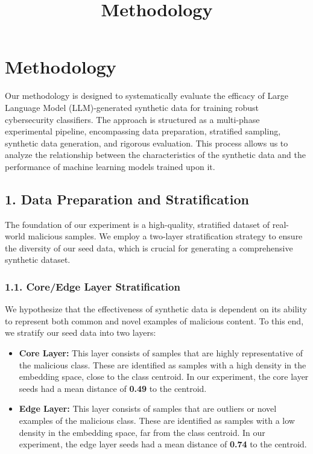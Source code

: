 \documentclass{article}
\title{Methodology}
\author{}
\date{}
\begin{document}
\maketitle

\section*{Methodology}

Our methodology is designed to systematically evaluate the efficacy of Large Language Model (LLM)-generated synthetic data for training robust cybersecurity classifiers. The approach is structured as a multi-phase experimental pipeline, encompassing data preparation, stratified sampling, synthetic data generation, and rigorous evaluation. This process allows us to analyze the relationship between the characteristics of the synthetic data and the performance of machine learning models trained upon it.

\subsection*{1. Data Preparation and Stratification}

The foundation of our experiment is a high-quality, stratified dataset of real-world malicious samples. We employ a two-layer stratification strategy to ensure the diversity of our seed data, which is crucial for generating a comprehensive synthetic dataset.

\subsubsection*{1.1. Core/Edge Layer Stratification}

We hypothesize that the effectiveness of synthetic data is dependent on its ability to represent both common and novel examples of malicious content. To this end, we stratify our seed data into two layers:

\begin{itemize}
    \item \textbf{Core Layer:} This layer consists of samples that are highly representative of the malicious class. These are identified as samples with a high density in the embedding space, close to the class centroid. In our experiment, the core layer seeds had a mean distance of \textbf{0.49} to the centroid.
    \item \textbf{Edge Layer:} This layer consists of samples that are outliers or novel examples of the malicious class. These are identified as samples with a low density in the embedding space, far from the class centroid. In our experiment, the edge layer seeds had a mean distance of \textbf{0.74} to the centroid.
\end{itemize}
\end{document}

